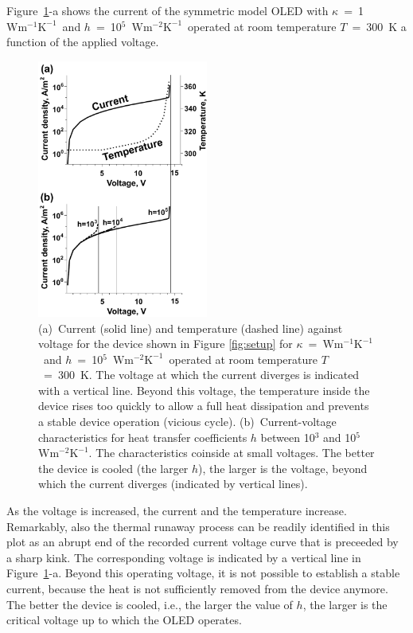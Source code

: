 \documentclass[%
9pt,
 aip,
rsi,%
 amsmath,amssymb,
preprint,%
]{revtex4-1}
\newcommand{\thermalconductivity}{$\mathrm{W m^{-1} K^{-1}}$}
\newcommand{\hcoefficient}{$\mathrm{W m^{-2} K^{-1}}$}
\begin{document}
Figure~\ref{fig:I-V}-a shows the current of the symmetric model OLED with $\kappa$~=~1~\thermalconductivity~and $h$~=~10$^{5}$~\hcoefficient~operated at room temperature $T$~=~300~K a function of the applied voltage.
%
\begin{figure}
\centering
\includegraphics[width=0.5\textwidth]{I-V.pdf} 
\caption{(a)~Current (solid line) and temperature (dashed line) against voltage for the device shown in Figure \ref{fig:setup} for $\kappa$~=~\thermalconductivity~and $h$~=~10$^{5}$~\hcoefficient~operated at room temperature $T$~=~300~K. The voltage at which the current diverges is indicated with a vertical line. Beyond this voltage, the temperature inside the device rises too quickly to allow a full heat dissipation and prevents a stable device operation (vicious cycle). (b)~Current-voltage characteristics for heat transfer coefficients $h$ between 10$^{3}$ and 10$^{5}$~\hcoefficient. The characteristics coinside at small voltages. The better the device is cooled (the larger $h$), the larger is the voltage, beyond which the current diverges (indicated by vertical lines).}
\label{fig:I-V}
\end{figure}
%
As the voltage is increased, the current and the temperature increase. 
Remarkably, also the thermal runaway process can be readily identified in this plot as an abrupt end of the recorded current voltage curve that is preceeded by a sharp kink. The corresponding voltage is indicated by a vertical line in Figure~\ref{fig:I-V}-a.
Beyond this operating voltage, it is not possible to establish a stable current, because the heat is not sufficiently removed from the device anymore. The better the device is cooled, i.e., the larger the value of $h$, the larger is the critical voltage up to which the OLED operates. 
\end{document}
